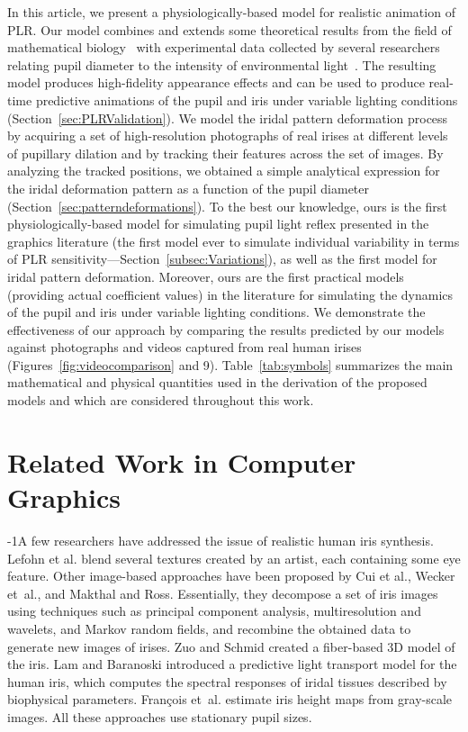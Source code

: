 \documentclass{acmtog}
\begin{document}
In this article, we present a physiologically-based model for realistic animation of PLR. Our model combines and extends
some theoretical results from the field of mathematical biology~\cite{CDFKMS-06} with experimental data collected by
several {researchers} relating pupil diameter to the intensity of environmental
light~\cite{BCHH:Collewijn:1988}. The resulting model produces high-fidelity appearance effects and can be used to produce real-time
predictive animations of the pupil and iris under variable lighting conditions (Section~\ref{sec:PLRValidation}).   We
model the iridal pattern deformation process by acquiring a set of high-resolution photographs of real irises at different
levels of pupillary dilation and by tracking their features across the set of images. By analyzing the tracked positions,
we obtained a simple analytical expression for the iridal deformation pattern as a function of the pupil diameter
(Section~\ref{sec:patterndeformations}). To the best our knowledge, ours is the first physiologically-based model for
simulating pupil light reflex presented in the graphics literature (the first model ever to simulate individual
variability in terms of PLR sensitivity---Section~\ref{subsec:Variations}), as well as the first model for iridal pattern
deformation.  Moreover, ours are the first practical models (providing actual coefficient values) in the literature for
simulating the dynamics of the pupil and iris under variable lighting conditions. We demonstrate the effectiveness of our
approach by comparing the results predicted by our models against photographs and videos captured from real human
irises (Figures~\ref{fig:videocomparison} and
9).  Table~\ref{tab:symbols}  summarizes the main mathematical and physical quantities used in the
derivation of the proposed models and which are considered throughout this work.


\section{Related Work in Computer Graphics}
\label{sec:relatedwork}
% 
\looseness-1A few researchers have addressed the issue of realistic human iris synthesis. Lefohn et al. blend several textures created by an artist, each containing some eye feature. Other image-based approaches have been proposed by Cui et al., Wecker
et~al., and Makthal and Ross. Essentially, they decompose a set of iris
images using techniques such as principal component analysis, multiresolution and wavelets, and Markov random fields, and
recombine the obtained data to generate new images of irises. Zuo and Schmid created a fiber-based 3D
model of the iris. Lam and Baranoski introduced a predictive light transport model for the human iris,
which computes the spectral responses of iridal tissues described by biophysical parameters. Fran\c{c}ois et~al. estimate iris height maps from gray-scale images. All these approaches use stationary pupil
sizes.
\end{document}

